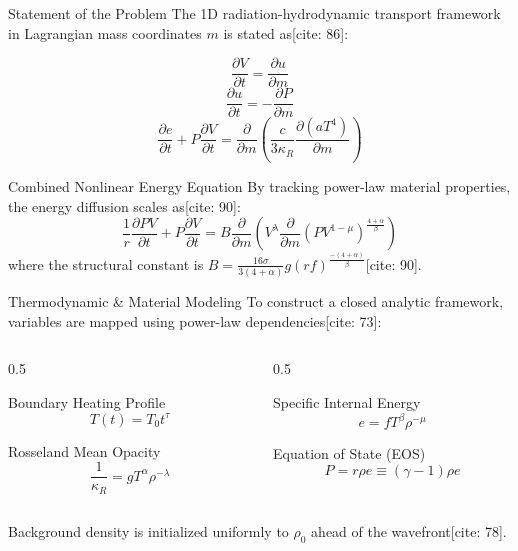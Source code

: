 \documentclass[presentation,10pt]{beamer}
\begin{document}
\begin{frame}{Statement of the Problem}
  The 1D radiation-hydrodynamic transport framework in Lagrangian mass coordinates $m$ is stated as[cite: 86]:
  
  $$\frac{\partial V}{\partial t} = \frac{\partial u}{\partial m}$$ %
  $$\frac{\partial u}{\partial t} = -\frac{\partial P}{\partial m}$$ %
  $$\frac{\partial e}{\partial t} + P\frac{\partial V}{\partial t} = \frac{\partial}{\partial m}\left(\frac{c}{3\kappa_R}\frac{\partial(aT^4)}{\partial m}\right)$$ %

  \begin{block}{Combined Nonlinear Energy Equation}
    By tracking power-law material properties, the energy diffusion scales as[cite: 90]:
    $$\frac{1}{r}\frac{\partial PV}{\partial t} + P\frac{\partial V}{\partial t} = B\frac{\partial}{\partial m}\left(V^\lambda \frac{\partial}{\partial m}(PV^{1-\mu})^{\frac{4+\alpha}{\beta}}\right)$$ %
    where the structural constant is $B = \frac{16\sigma}{3(4+\alpha)}g(rf)^{\frac{-(4+\alpha)}{\beta}}$[cite: 90].
  \end{block}
\end{frame}

\begin{frame}{Thermodynamic \& Material Modeling}
  To construct a closed analytic framework, variables are mapped using power-law dependencies[cite: 73]:
  
  \begin{columns}[t]
    \begin{column}{0.5\textwidth}
      \begin{block}{Boundary Heating Profile}
        $$T(t) = T_0 t^\tau$$ %
      \end{block}
      \begin{block}{Rosseland Mean Opacity}
        $$\frac{1}{\kappa_R} = g T^\alpha \rho^{-\lambda}$$ %
      \end{block}
    \end{column}
    
    \begin{column}{0.5\textwidth}
      \begin{block}{Specific Internal Energy}
        $$e = f T^\beta \rho^{-\mu}$$ %
      \end{block}
      \begin{block}{Equation of State (EOS)}
        $$P = r\rho e \equiv (\gamma - 1)\rho e$$ %
      \end{block}
    \end{column}
  \end{columns}
  
  \vspace{0.4cm}
  Background density is initialized uniformly to $\rho_0$ ahead of the wavefront[cite: 78].
\end{frame}
\end{document}
